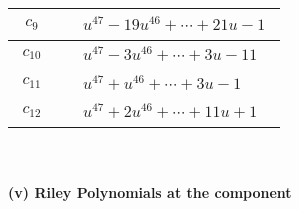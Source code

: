 \documentclass[1p]{elsarticle_modified}
\theoremstyle{definition}
\begin{document}
\begin{tabular}{m{50pt}|m{274pt}}
\hline $$\begin{aligned}c_{9}\end{aligned}$$&$\begin{aligned}
&u^{47}-19 u^{46}+\cdots+21 u-1
\end{aligned}$\\
\hline $$\begin{aligned}c_{10}\end{aligned}$$&$\begin{aligned}
&u^{47}-3 u^{46}+\cdots+3 u-11
\end{aligned}$\\
\hline $$\begin{aligned}c_{11}\end{aligned}$$&$\begin{aligned}
&u^{47}+u^{46}+\cdots+3 u-1
\end{aligned}$\\
\hline $$\begin{aligned}c_{12}\end{aligned}$$&$\begin{aligned}
&u^{47}+2 u^{46}+\cdots+11 u+1
\end{aligned}$\\
\hline
\end{tabular}\\~\\
\newpage\renewcommand{\arraystretch}{1}
\flushleft \textbf{(v) Riley Polynomials at the component}\newline \\
\end{document}
